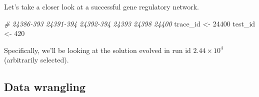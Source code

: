 \documentclass[]{book}
\newenvironment{Shaded}{\begin{snugshade}}{\end{snugshade}}
\newcommand{\CommentTok}[1]{\textcolor[rgb]{0.56,0.35,0.01}{\textit{#1}}}
\newcommand{\DecValTok}[1]{\textcolor[rgb]{0.00,0.00,0.81}{#1}}
\newcommand{\NormalTok}[1]{#1}
\newcommand{\StringTok}[1]{\textcolor[rgb]{0.31,0.60,0.02}{#1}}
\begin{document}
Let's take a closer look at a successful gene regulatory network.

\begin{Shaded}
\begin{Highlighting}[]
\CommentTok{# 24386-393 24391-394 24392-394 24393 24398 24400}
\NormalTok{trace_id <-}\StringTok{ }\DecValTok{24400}
\NormalTok{test_id <-}\StringTok{ }\DecValTok{420}
\end{Highlighting}
\end{Shaded}

Specifically, we'll be looking at the solution evolved in run id \ensuremath{2.44\times 10^{4}} (arbitrarily selected).

\hypertarget{data-wrangling-1}{%
\subsection{Data wrangling}\label{data-wrangling-1}}
\end{document}

